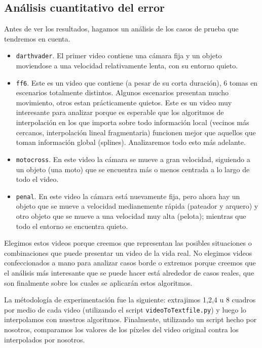 \subsection{Análisis cuantitativo del error}

Antes de ver los resultados, hagamos un análisis de los casos de prueba que tendremos en cuenta.

\begin{itemize}
    \item \texttt{darthvader}. El primer video contiene una cámara fija y un objeto moviendose a una velocidad relativamente lenta, con su entorno quieto. 
    \item \texttt{ff6}. Este es un video que contiene (a pesar de su corta duración), 6 tomas en escenarios totalmente distintos. Algunos escenarios presentan mucho movimiento, otros estan prácticamente quietos. Este es un video muy interesante para analizar porque es esperable que los algoritmos de interpolación en los que importa sobre todo información local (vecinos más cercanos, interpolación lineal fragmentaria) funcionen mejor que aquellos que toman información global (splines). Analizaremos todo esto más adelante. 
    \item \texttt{motocross}. En este video la cámara se mueve a gran velocidad, siguiendo a un objeto (una moto) que se encuentra más o menos centrada a lo largo de todo el video. 
    \item \texttt{penal}. En este video la cámara está nuevamente fija, pero ahora hay un objeto que se mueve a velocidad medianemente rápida (pateador y arquero) y otro objeto que se mueve a una velocidad muy alta (pelota); mientras que todo el entorno se encuentra quieto. 
\end{itemize}

Elegimos estos videos porque creemos que representan las posibles situaciones o combinaciones que puede presentar un video de la vida real. No elegimos videos confeccionados a mano para analizar casos borde o extremos porque creemos que el análisis más interesante que se puede hacer está alrededor de casos reales, que son finalmente sobre los cuales se aplicarán estos algoritmos.

La métodología de experimentación fue la siguiente: extrajimos 1,2,4 u 8 cuadros por medio de cada video (utilizando el script \texttt{videoToTextfile.py}) y luego lo interpolamos con nuestros algoritmos. Finalmente, utilizando un script hecho por nosotros, comparamos los valores de los píxeles del video original contra los interpolados por nosotros. 


